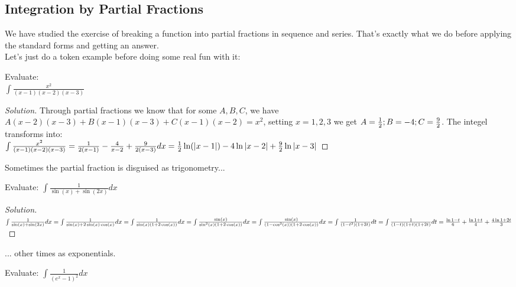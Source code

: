 \subsection{Integration by Partial Fractions}
We have studied the exercise of breaking a function into partial fractions in sequence and series. That's exactly what we do before applying the standard forms and getting an answer.\\
Let's just do a token example before doing some real fun with it:\\
\begin{example}
    Evaluate: \\
    $\int \frac{x^2}{(x-1)(x-2)(x-3)}$
\end{example}
\begin{proof}
    [Solution]
    Through partial fractions we know that for some $A,B,C$, we have $A(x-2)(x-3)+B(x-1)(x-3)+C(x-1)(x-2)=x^2$, setting $x=1,2,3$ we get $A=\frac{1}{2}; B= -4; C=\frac{9}{2}\\$. The integel transforms into:\\
    $\int \frac{x^2}{(x-1)(x-2)(x-3)}\\
    = \frac{1}{2(x-1)}-\frac{4}{x-2}+\frac{9}{2(x-3)} dx\\
    = \frac{1}{2}\ln(|x-1|)-4\ln{|x-2|}+\frac{9}{2}\ln{|x-3|}$
\end{proof}
Sometimes the partial fraction is disguised as trigonometry...\\
\begin{example}
    Evaluate: $\int \frac{1}{\sin(x)+\sin(2x)}dx$
\end{example}
\begin{proof}
    [Solution]
    $\int \frac{1}{\sin(x)+\sin(2x)}dx\\
    = \int \frac{1}{\sin(x)+2\sin(x)\cos(x)}dx\\
    = \int \frac{1}{\sin(x)(1+2\cos(x))}dx\\
    = \int \frac{\sin(x)}{\sin^2(x)(1+2\cos(x))}dx\\
    = \int \frac{\sin(x)}{(1-\cos^2(x))(1+2\cos(x))}dx\\
    = \int \frac{1}{(1-t^2)(1+2t)}dt\\
    = \int \frac{1}{(1-t)(1+t)(1+2t)}dt\\
    = \frac{\ln{1-t}}{6} + \frac{\ln{1+t}}{4} + \frac{4\ln{1+2t}}{3}
    $
\end{proof}
... other times as exponentials.\\
\begin{example}
     Evaluate: $\int \frac{1}{(e^x-1)^2}dx$
\end{example}
